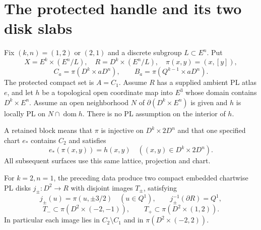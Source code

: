 \section{The protected handle and its two disk slabs}
\label{sec:dehn-protected-disks}

Fix $(k,n)=(1,2)$ or $(2,1)$ and a discrete subgroup
$L\subset E^n$.  Put
\[
 X=E^k\times(E^n/L),\quad R=D^k\times(E^n/L),\quad
 \pi(x,y)=(x,[y]),
\]
\[
 C_a=\pi(D^k\times aD^n),\qquad
 B_a=\pi(Q^{k-1}\times aD^n).
\]
The protected compact set is $A=C_1$.  Assume $R$ has a supplied
ambient PL atlas $e$, and let $h$ be a topological open coordinate
map into $E^3$ whose domain contains $D^k\times E^n$.  Assume an
open neighborhood $N$ of $\partial(D^k\times E^n)$ is given and
$h$ is locally PL on $N\cap\operatorname{dom}h$.
There is no PL assumption on the interior of $h$.

\begin{definition}
\label{def:dehn-retained-block}
A retained block means that $\pi$ is injective on $D^k\times2D^n$
and that one specified chart $e_*$ contains $C_2$ and satisfies
\[
                 e_*(\pi(x,y))=h(x,y)
                 \quad ((x,y)\in D^k\times2D^n).
\]
All subsequent surfaces use this same lattice, projection and chart.
\end{definition}

\begin{theorem}
\label{thm:dehn-protected-disks}
For $k=2,n=1$, the preceding data produce two compact embedded
chartwise PL disks $j_\pm:D^2\to R$ with disjoint images $T_\pm$,
satisfying
\[
 j_\pm(u)=\pi(u,\pm3/2)\quad(u\in Q^1),\qquad
 j_\pm^{-1}(\partial R)=Q^1,
\]
\[
 T_-\subset\pi(D^2\times(-2,-1)),\qquad
 T_+\subset\pi(D^2\times(1,2)).
\]
In particular each image lies in $C_2\setminus C_1$ and in
$\pi(D^2\times(-2,2))$.
\end{theorem}

